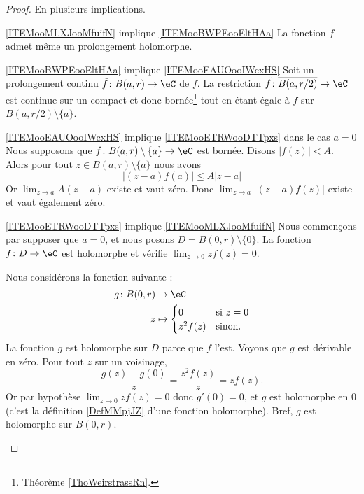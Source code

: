 \begin{proof}
	En plusieurs implications.
	\begin{subproof}
		\item[\ref{ITEMooMLXJooMfuifN} implique \ref{ITEMooBWPEooEltHAa}]
		La fonction \( f\) admet même un prolongement holomorphe.
		\item[\ref{ITEMooBWPEooEltHAa} implique \ref{ITEMooEAUOooIWcxHS}]
		Soit un prolongement continu \( \tilde f\colon B(a,r)\to \eC\) de \( f\). La restriction \( \tilde f\colon \overline{ B(a,r/2) }\to \eC\) est continue sur un compact et donc bornée\footnote{Théorème \ref{ThoWeirstrassRn}.} tout en étant égale à \( f\) sur \( B(a,r/2)\setminus\{ a \}\).
		\item[\ref{ITEMooEAUOooIWcxHS} implique \ref{ITEMooETRWooDTTpxs} dans le cas \( a=0\)]
		Nous supposons que \( f\colon B(a,r)\setminus\{ a \}\to \eC\) est bornée. Disons \( | f(z) |<A\). Alors pour tout \( z\in B(a,r)\setminus\{ a \}\) nous avons
		\begin{equation}
			| (z-a)f(a) |\leq A| z-a |
		\end{equation}
		Or \( \lim_{z\to a}A(z-a)\) existe et vaut zéro. Donc \( \lim_{z\to a}| (z-a)f(z) |\) existe et vaut également zéro.
		\item[\ref{ITEMooETRWooDTTpxs} implique \ref{ITEMooMLXJooMfuifN}]
		Nous commençons par supposer que \( a=0\), et nous posons \( D=B(0,r)\setminus\{ 0 \}\). La fonction \( f\colon D\to \eC\) est holomorphe et vérifie \( \lim_{z\to 0}zf(z)=0\).

		Nous considérons la fonction suivante :
		\begin{equation}
			\begin{aligned}
				g\colon B(0,r) & \to \eC                            \\
				z              & \mapsto \begin{cases}
					0       & \text{si } z=0 \\
					z^2f(z) & \text{sinon. }
				\end{cases}
			\end{aligned}
		\end{equation}
		La fonction \( g\) est holomorphe sur \( D\) parce que \( f\) l'est. Voyons que \( g\) est dérivable en zéro. Pour tout \( z\) sur un voisinage,
		\begin{equation}
			\frac{ g(z)-g(0) }{ z }=\frac{ z^2f(z) }{ z }=zf(z).
		\end{equation}
		Or par hypothèse \( \lim_{z\to 0}zf(z)=0\) donc \( g'(0)=0\), et \( g\) est holomorphe en \( 0\) (c'est la définition \ref{DefMMpjJZ} d'une fonction holomorphe). Bref, \( g\) est holomorphe sur \( B(0,r)\).


\end{subproof}
\end{proof}
